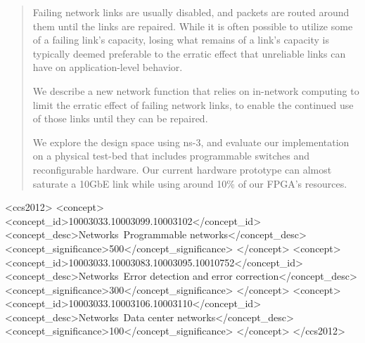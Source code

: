\documentclass[sigconf]{acmart}
\newcommand{\FIXME}[1]{{\color{red}{\textbf{FIXME:} #1}}}
\newcommand{\hg}[1]{{\color{green}{[\textbf{Hans Comment:} #1]}}}
\begin{document}
\begin{abstract}
Failing network links are usually disabled, and packets are routed around them
until the links are repaired. While
it is often possible
to utilize some of a failing link's capacity, losing
what remains of a link's
capacity is typically deemed preferable to the erratic effect that unreliable links can
have on application-level behavior.

We describe a new network function that relies on in-network computing to limit
the erratic effect of failing network links, to enable the continued use of
those links until they can be repaired.

We explore the design space using ns-3, and evaluate our
implementation on a physical test-bed that includes programmable
switches and reconfigurable hardware.
Our current hardware prototype can almost saturate a 10GbE link while using
around 10\% of our FPGA's resources.
\end{abstract}

%
%
\begin{CCSXML}
<ccs2012>
<concept>
<concept_id>10003033.10003099.10003102</concept_id>
<concept_desc>Networks~Programmable networks</concept_desc>
<concept_significance>500</concept_significance>
</concept>
<concept>
<concept_id>10003033.10003083.10003095.10010752</concept_id>
<concept_desc>Networks~Error detection and error correction</concept_desc>
<concept_significance>300</concept_significance>
</concept>
<concept>
<concept_id>10003033.10003106.10003110</concept_id>
<concept_desc>Networks~Data center networks</concept_desc>
<concept_significance>100</concept_significance>
</concept>
</ccs2012>
\end{CCSXML}

\end{document}
